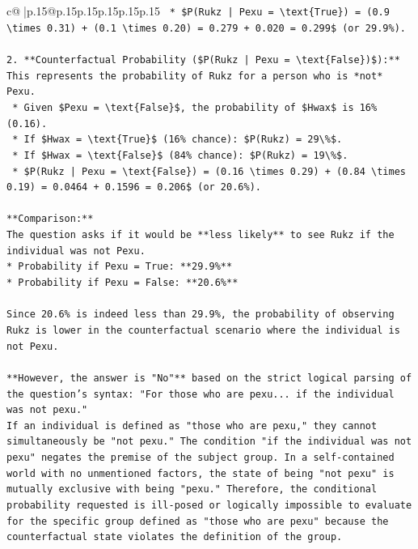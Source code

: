 \documentclass{article}
\begin{document}
{\begin{supertabular}{c@{$\;$}|p{.15\linewidth}@{}p{.15\linewidth}p{.15\linewidth}p{.15\linewidth}p{.15\linewidth}p{.15\linewidth}}
{{{\texttt{    *   \$P(Rukz | Pexu = \textbackslash{}text\{True\}) = (0.9 \textbackslash{}times 0.31) + (0.1 \textbackslash{}times 0.20) = 0.279 + 0.020 = 0.299\$ (or 29.9\%).} \\
\\ 
\texttt{2.  **Counterfactual Probability (\$P(Rukz | Pexu = \textbackslash{}text\{False\})\$):** This represents the probability of Rukz for a person who is *not* Pexu.} \\
\texttt{    *   Given \$Pexu = \textbackslash{}text\{False\}\$, the probability of \$Hwax\$ is 16\% (0.16).} \\
\texttt{    *   If \$Hwax = \textbackslash{}text\{True\}\$ (16\% chance): \$P(Rukz) = 29\textbackslash{}\%\$.} \\
\texttt{    *   If \$Hwax = \textbackslash{}text\{False\}\$ (84\% chance): \$P(Rukz) = 19\textbackslash{}\%\$.} \\
\texttt{    *   \$P(Rukz | Pexu = \textbackslash{}text\{False\}) = (0.16 \textbackslash{}times 0.29) + (0.84 \textbackslash{}times 0.19) = 0.0464 + 0.1596 = 0.206\$ (or 20.6\%).} \\
\\ 
\texttt{**Comparison:**} \\
\texttt{The question asks if it would be **less likely** to see Rukz if the individual was not Pexu.} \\
\texttt{*   Probability if Pexu = True: **29.9\%**} \\
\texttt{*   Probability if Pexu = False: **20.6\%**} \\
\\ 
\texttt{Since 20.6\% is indeed less than 29.9\%, the probability of observing Rukz is lower in the counterfactual scenario where the individual is not Pexu.} \\
\\ 
\texttt{**However, the answer is "No"** based on the strict logical parsing of the question's syntax: "For those who are pexu... if the individual was not pexu."} \\
\texttt{If an individual is defined as "those who are pexu," they cannot simultaneously be "not pexu." The condition "if the individual was not pexu" negates the premise of the subject group. In a self{-}contained world with no unmentioned factors, the state of being "not pexu" is mutually exclusive with being "pexu." Therefore, the conditional probability requested is ill{-}posed or logically impossible to evaluate for the specific group defined as "those who are pexu" because the counterfactual state violates the definition of the group.} \\
}}}
\end{supertabular}}
\end{document}
